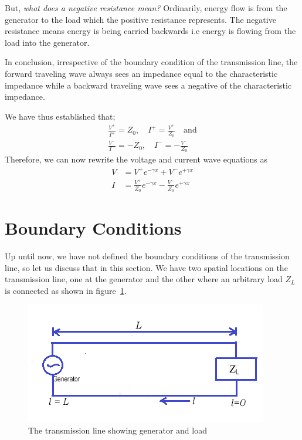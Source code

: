 But, \emph{what does a negative resistance mean?} Ordinarily, energy flow is from the generator to the load which the positive resistance represents. The negative resistance means energy is being carried backwards i.e energy is flowing from the load into the generator.

In conclusion, irrespective of the boundary condition of the transmission line, the forward traveling wave always sees an impedance equal to the characteristic impedance while a backward traveling wave sees a negative of the characteristic impedance.

We have thus established that;
\begin{align*}
\frac{V^+}{I^+} = Z_0,\quad I^+ = \frac{V^+}{Z_0}\quad\text{and}\\
\frac{V^-}{I^-} = -Z_0,\quad I^- = -\frac{V^-}{Z_0}
\end{align*}
Therefore, we can now rewrite the voltage and current wave equations as
\begin{align}
V &= V^+e^{-\gamma x}+V^-e^{+\gamma x}
\label{eqn:voltagelec3}\\
I &= \frac{V^+}{Z_0}e^{-\gamma x}-\frac{V^-}{Z_0}e^{+\gamma x}
\label{eqn:currentlec3}
\end{align}

\section{Boundary Conditions}
Up until now, we have not defined the boundary conditions of the transmission line, so let us discuss that in this section. We have two spatial locations on the transmission line, one at the generator and the other where an arbitrary load $Z_L$ is connected as shown in figure~\ref{fig:tlcircuit}.
\begin{figure}[h]
\centering
\includegraphics[scale=0.8]{./graphics/tlcircuit}
\caption{The transmission line showing generator and load}
\label{fig:tlcircuit}
\end{figure}


